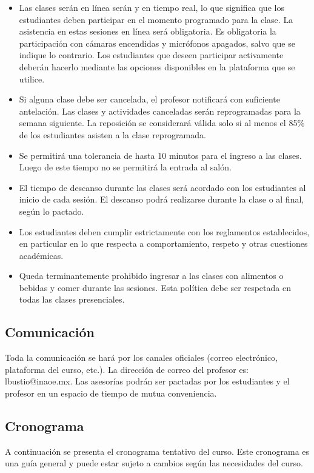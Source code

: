 \documentclass[
  coursetitle={Cómputo Nube y Tecnologías Emergentes},
  coursehours={96},
  coursedate={Verano 2026},
  doctype={Guía del curso},
  otherlangs={english,french},
  authorname={Lázaro},
  authorsurname={Bustio-Martínez},
  authortitle={PhD},
  role={Profesor Investigador},
  email={lbustio@inaoe.mx},
  phone={5559504000},
  ext={7459},
  institution={Instituto Nacional de Astrofísica, Óptica y Electrónica (INAOE)},
  department={Maestría en Ciencias en Tecnologías de Seguridad},
  address={Luis Enrique Erro 1, Sta. Ma. Tonantzintla, San Andrés Cholula, CP 72840, Puebla, México},
  margin={0.5in}
]{../../lbustio_lecture_notes}
\begin{document}
\begin{itemize}
  \item Las clases serán en línea serán y en tiempo real, lo que significa que los estudiantes deben participar en el momento programado para la clase. La asistencia en estas sesiones en línea será obligatoria. Es obligatoria la participación con cámaras encendidas y micrófonos apagados, salvo que se indique lo contrario. Los estudiantes que deseen participar activamente deberán hacerlo mediante las opciones disponibles en la plataforma que se utilice.
  \item Si alguna clase debe ser cancelada, el profesor notificará con suficiente antelación. Las clases y actividades canceladas serán reprogramadas para la semana siguiente. La reposición se considerará válida solo si al menos el 85\% de los estudiantes asisten a la clase reprogramada.
  \item Se permitirá una tolerancia de hasta 10 minutos para el ingreso a las clases. Luego de este tiempo no se permitirá la entrada al salón.
  \item El tiempo de descanso durante las clases será acordado con los estudiantes al inicio de cada sesión. El descanso podrá realizarse durante la clase o al final, según lo pactado.
  \item Los estudiantes deben cumplir estrictamente con los reglamentos establecidos, en particular en lo que respecta a comportamiento, respeto y otras cuestiones académicas.
  \item Queda terminantemente prohibido ingresar a las clases con alimentos o bebidas y comer durante las sesiones. Esta política debe ser respetada en todas las clases presenciales.

\end{itemize}

\subsection{Comunicación}
\label{sec:comuinicacion}
Toda la comunicación se hará por los canales oficiales (correo electrónico, plataforma del curso, etc.). La dirección de correo del profesor es: lbustio@inaoe.mx. Las asesorías podrán ser pactadas por los estudiantes y el profesor en un espacio de tiempo de mutua conveniencia.


\subsection{Cronograma}
\label{sec:cronograma}

A continuación se presenta el cronograma tentativo del curso. Este cronograma es una guía general y puede estar sujeto a cambios según las necesidades del curso.
\end{document}
